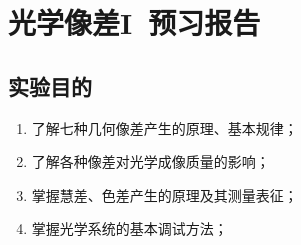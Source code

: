 \documentclass[dvipsnames, svgnames,a4paper,11pt]{article}
\newcommand{\exname}{光学像差I}%
\begin{document}
\clearpage
\tableofcontents
\clearpage

\setcounter{section}{0}
\section{\exname\ \textbf{预习报告}}
	
\subsection{实验目的}
\begin{enumerate}
	\item 了解七种几何像差产生的原理、基本规律；
	\item 了解各种像差对光学成像质量的影响；
	\item 掌握慧差、色差产生的原理及其测量表征；
	\item 掌握光学系统的基本调试方法；
\end{enumerate}
\end{document}
